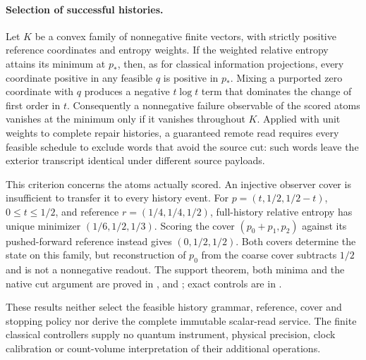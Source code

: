 \paragraph{Selection of successful histories.}
Let $K$ be a convex family of nonnegative finite vectors, with strictly
positive reference coordinates and entropy weights. If the weighted
relative entropy attains its minimum at $p_*$, then, as for classical
information projections, every coordinate positive in any feasible $q$ is
positive in $p_*$. Mixing a purported zero
coordinate with $q$ produces a negative $t\log t$ term that dominates the
change of first order in $t$. Consequently a
nonnegative failure observable of the scored atoms vanishes at the minimum
only if it vanishes throughout $K$. Applied with unit weights to complete repair histories,
a guaranteed remote read requires every feasible schedule to exclude words
that avoid the source cut: such words leave the exterior transcript
identical under different source payloads.

This criterion concerns the atoms actually scored. An injective observer
cover is insufficient to transfer it to every history event. For
$p=(t,1/2,1/2-t)$, $0\leq t\leq1/2$, and reference
$r=(1/4,1/4,1/2)$, full-history relative entropy has unique minimizer
$(1/6,1/2,1/3)$. Scoring the cover $(p_0+p_1,p_2)$ against its pushed-forward
reference instead gives $(0,1/2,1/2)$. Both covers determine the state on
this family, but reconstruction of $p_0$ from the coarse cover subtracts
$1/2$ and is not a nonnegative readout. The support theorem, both minima
and the native cut argument are proved in
,
 and
; exact controls are in
.

These results neither select the feasible history grammar, reference, cover
and stopping policy nor derive the complete immutable scalar-read service.
The finite classical controllers supply no quantum instrument, physical
precision, clock calibration or count-volume interpretation of their
additional operations.
